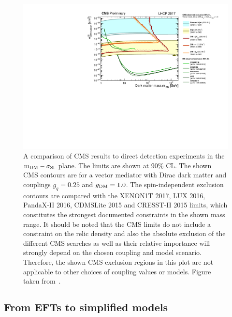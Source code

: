 \begin{figure}[p]
  \centering
  \includegraphics[width=\textwidth]{SI_CMSDD_Summary.pdf}
  \caption{A comparison of \acs{CMS} results to direct detection experiments in the $\protect\mathrm{m_{DM}}-\sigma_{\mathrm{SI}}$ plane. The limits are shown at 90\% CL. The shown \acs{CMS} contours are for a vector mediator with Dirac dark matter and  couplings $g_q=0.25$ and $\protect g_{\mathrm{DM}} = 1.0$. The spin-independent exclusion contours are compared with the XENON1T 2017, LUX 2016, PandaX-II 2016, CDMSLite 2015 and CRESST-II 2015 limits, which constitutes the strongest documented constraints in the shown mass range. It should be noted that the \acs{CMS} limits do not include a constraint on the relic density and also the absolute exclusion of the different \acs{CMS} searches as well as their relative importance will strongly depend on the chosen coupling and model scenario.  Therefore, the shown \acs{CMS} exclusion regions in this plot are not applicable to other choices of coupling values or models. Figure taken from~\cite{DMsummary}.}
  \label{fig:summary_SI}
\end{figure}

\subsection{From EFTs to simplified models}

